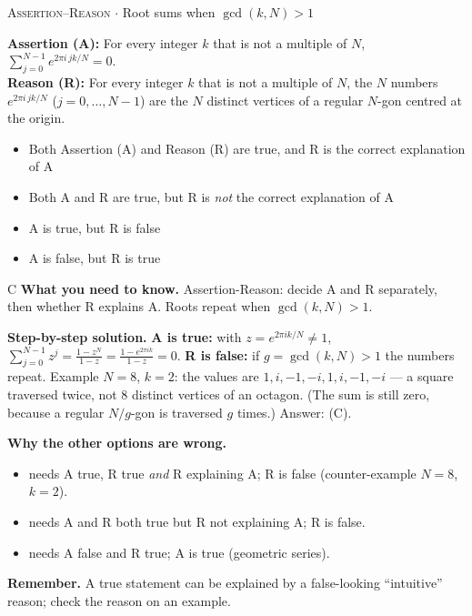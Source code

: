 \documentclass[11pt,a4paper]{article}
\newcommand{\optlabel}[1]{\textbf{(#1)}}
\newcommand{\correctlabel}[1]{\textcolor{okgreen}{\textbf{(#1)}\,\ding{51}}}
\newenvironment{qitem}[1]{\begin{list}{}{\setlength{\leftmargin}{3.3em}\setlength{\labelwidth}{3.1em}%
  \setlength{\labelsep}{0.2em}\setlength{\topsep}{3pt}\setlength{\parsep}{3pt}}\item[\textbf{Q.#1}\hfill]}{\end{list}}
\newcommand{\qsep}{\par\vspace{2pt}{\color{black!15}\hrule}\vspace{4pt}}
\newcommand{\qmeta}[2]{{\footnotesize\color{black!60}\textsc{#1} \;$\cdot$\; #2}\par}
\begin{document}
\begin{qitem}{17}
\qmeta{Assertion--Reason}{Root sums when $\gcd(k,N)>1$}
\textbf{Assertion (A):} For every integer $k$ that is not a multiple of $N$, $\displaystyle\sum_{j=0}^{N-1} e^{2\pi i\,jk/N} = 0$.\\[1mm]
\textbf{Reason (R):} For every integer $k$ that is not a multiple of $N$, the $N$ numbers $e^{2\pi i\,jk/N}$
($j = 0, \dots, N-1$) are the $N$ distinct vertices of a regular $N$-gon centred at the origin.
\begin{itemize}[leftmargin=2.6em, labelsep=0.4em, itemsep=2pt, topsep=3pt]
\item[\optlabel{A}] Both Assertion (A) and Reason (R) are true, and R is the correct explanation of A
\item[\optlabel{B}] Both A and R are true, but R is \emph{not} the correct explanation of A
\item[\correctlabel{C}] A is true, but R is false
\item[\optlabel{D}] A is false, but R is true
\end{itemize}
\end{qitem}
\begin{solbox}{C}
\textbf{\color{brand}What you need to know.} Assertion-Reason: decide A and R separately, then whether R explains A. Roots repeat when $\gcd(k,N) > 1$.

\textbf{\color{brand}Step-by-step solution.} \textbf{A is true:} with $z = e^{2\pi i k/N} \neq 1$, $\sum_{j=0}^{N-1} z^j = \frac{1-z^N}{1-z} = \frac{1 - e^{2\pi i k}}{1-z} = 0$.
\textbf{R is false:} if $g = \gcd(k, N) > 1$ the numbers repeat. Example $N = 8$, $k = 2$: the values are
$1, i, -1, -i, 1, i, -1, -i$ --- a square traversed twice, not 8 distinct vertices of an octagon. (The sum is still zero,
because a regular $N/g$-gon is traversed $g$ times.) Answer: (C).

\textbf{\color{brand}Why the other options are wrong.}
\begin{itemize}[leftmargin=2.4em, itemsep=1pt, topsep=2pt]
\item[\textbf{(A)}] needs A true, R true \emph{and} R explaining A; R is false (counter-example $N=8$, $k=2$).
\item[\textbf{(B)}] needs A and R both true but R not explaining A; R is false.
\item[\textbf{(D)}] needs A false and R true; A is true (geometric series).
\end{itemize}
\textbf{\color{brand}Remember.} A true statement can be explained by a false-looking ``intuitive'' reason; check the reason on an example.
\end{solbox}
\qsep
\end{document}
